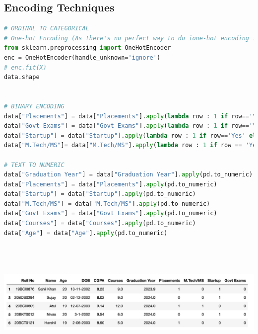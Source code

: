 \documentclass{article}
\begin{document}
\subsection{Encoding Techniques}
\begin{lstlisting}[language=Python]
# ORDINAL TO CATEGORICAL
# One-hot Encoding (As there's no perfect way to do ione-hot encoding in this dataset)
from sklearn.preprocessing import OneHotEncoder
enc = OneHotEncoder(handle_unknown='ignore')
# enc.fit(X)
data.shape


# BINARY ENCODING
data["Placements"] = data["Placements"].apply(lambda row : 1 if row=='Yes' else 0)
data["Govt Exams"] = data["Govt Exams"].apply(lambda row : 1 if row=='Yes' else 0)
data["Startup"] = data["Startup"].apply(lambda row : 1 if row=='Yes' else 0)
data["M.Tech/MS"]= data["M.Tech/MS"].apply(lambda row : 1 if row == 'Yes' else 0)

# TEXT TO NUMERIC
data["Graduation Year"] = data["Graduation Year"].apply(pd.to_numeric)
data["Placements"] = data["Placements"].apply(pd.to_numeric)
data["Startup"] = data["Startup"].apply(pd.to_numeric)
data["M.Tech/MS"] = data["M.Tech/MS"].apply(pd.to_numeric)
data["Govt Exams"] = data["Govt Exams"].apply(pd.to_numeric)
data["Courses"] = data["Courses"].apply(pd.to_numeric)
data["Age"] = data["Age"].apply(pd.to_numeric)


\end{lstlisting}\\\\\\
\includegraphics[scale=0.55]{images/seven.png}
\end{document}
